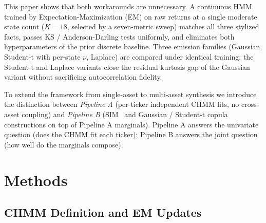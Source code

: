 \documentclass[sigconf,anonymous,nonacm=true]{acmart}
\begin{document}
This paper shows that both workarounds are unnecessary. A continuous
HMM trained by Expectation-Maximization (EM) on raw returns at a single
moderate state count ($K = 18$, selected by a seven-metric sweep) matches
all three stylized facts, passes KS / Anderson-Darling tests uniformly,
and eliminates both hyperparameters of the prior discrete
baseline. Three emission families (Gaussian, Student-t with per-state
$\nu$, Laplace) are compared under identical training; the Student-t and
Laplace variants close the residual kurtosis gap of the Gaussian variant
without sacrificing autocorrelation fidelity.

To extend the framework from single-asset to multi-asset synthesis we
introduce the distinction between \emph{Pipeline A} (per-ticker
independent CHMM fits, no cross-asset coupling) and \emph{Pipeline B}
(SIM~\cite{sharpe1963simplified} and Gaussian / Student-t
copula~\cite{sklar1959fonctions, demarta2005tcopula} constructions on top
of Pipeline A marginals). Pipeline A answers the univariate question
(does the CHMM fit each ticker); Pipeline B answers the joint question
(how well do the marginals compose).

\section{Methods}
\label{sec:methods}

\subsection{CHMM Definition and EM Updates}
\label{sec:methods_chmm}
\end{document}
